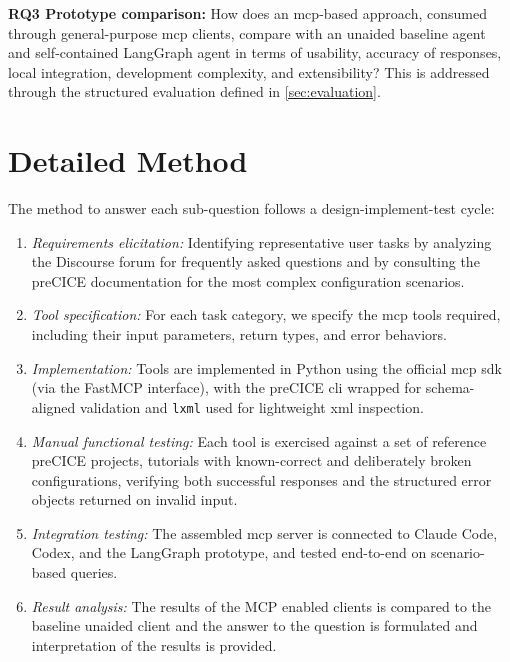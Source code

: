 \documentclass[
  numbers=noenddot,
  english,
  a4paper,
  twoside,
  bibliography=totoc,
  headsepline,
  cleardoublepage=empty,
  parskip=half,
  draft=false
]{scrbook}
\theoremstyle{break}
\renewcommand{\_}{\textunderscore\allowbreak}
\begin{document}
\textbf{RQ3 Prototype comparison:} How does an \gls{mcp}-based approach, consumed
        through general-purpose \gls{mcp} clients, compare with an unaided baseline agent and self-contained LangGraph
        agent in terms of usability, accuracy of responses, local integration, development
        complexity, and extensibility?
        This is addressed through the structured evaluation defined in \cref{sec:evaluation}.


\section{Detailed Method}\label{sec:problem-exposition:research-method}

The method to answer each sub-question follows a design-implement-test cycle:

\begin{enumerate}
  \item \emph{Requirements elicitation:} Identifying representative user tasks by analyzing
        the Discourse forum for frequently asked questions and by consulting the preCICE
        documentation for the most complex configuration scenarios.
  \item \emph{Tool specification:} For each task category, we specify the \gls{mcp} tools
        required, including their input parameters, return types, and error behaviors.
  \item \emph{Implementation:} Tools are implemented in Python using the official \gls{mcp}
        \gls{sdk} (via the FastMCP interface), with the preCICE \gls{cli} wrapped for
        schema-aligned validation and \texttt{lxml} used for lightweight \gls{xml} inspection.
  \item \emph{Manual functional testing:} Each tool is exercised against a set of reference
        preCICE projects, tutorials with known-correct and deliberately broken configurations, verifying
        both successful responses and the structured error objects returned on invalid input.
  \item \emph{Integration testing:} The assembled \gls{mcp} server is connected to Claude
        Code, Codex, and the LangGraph prototype, and tested end-to-end on
        scenario-based queries.
    \item \emph{Result analysis:} The results of the MCP enabled clients is compared to the baseline 
    unaided client and the answer to the question is formulated and interpretation of the results 
    is provided.
\end{enumerate}
\end{document}
